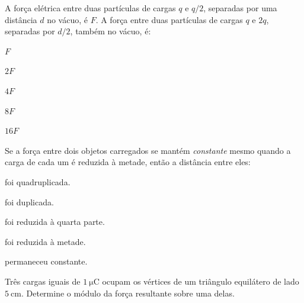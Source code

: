 \blocoaplicacao
\begin{questao}[2]{}

A força elétrica entre duas partículas de cargas $q$ e $q/2$, separadas por uma
distância $d$ no vácuo, é $F$. A força entre duas partículas de cargas $q$ e $2q$,
separadas por $d/2$, também no vácuo, é:
\begin{alternativas}[3]
\item $F$
\item $2F$
\item $4F$
\item $8F$
\item $16F$
\end{alternativas}


\end{questao}
\begin{questao}[2]{}

Se a força entre dois objetos carregados se mantém \emph{constante} mesmo quando a
carga de cada um é reduzida à metade, então a distância entre eles:
\begin{alternativas}
\item foi quadruplicada.
\item foi duplicada.
\item foi reduzida à quarta parte.
\item foi reduzida à metade.
\item permaneceu constante.
\end{alternativas}


\end{questao}
\begin{questao}[2]{}

Três cargas iguais de $\SI{+1}{\micro\coulomb}$ ocupam os vértices de um triângulo
equilátero de lado $\SI{5}{\centi\meter}$. Determine o módulo da força resultante
sobre uma delas.




\end{questao}
